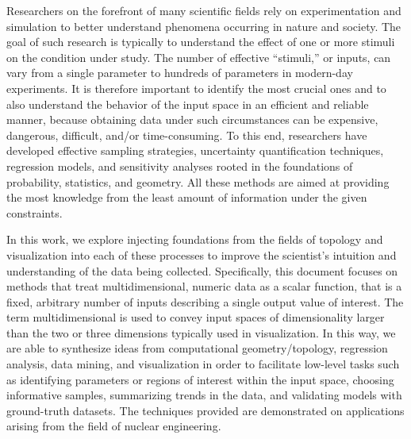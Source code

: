 
Researchers on the forefront of many scientific fields rely on experimentation and simulation to better understand phenomena occurring in nature and society.
%
The goal of such research is typically to understand the effect of one or more stimuli on the condition under study.
%
The number of effective ``stimuli,'' or inputs, can vary from a single parameter to hundreds of parameters in modern-day experiments.
%
It is therefore important to identify the most crucial ones and to also understand the behavior of the input space in an efficient and reliable manner, because obtaining data under such circumstances can be expensive, dangerous, difficult, and/or time-consuming.
%
To this end, researchers have developed effective sampling strategies, uncertainty quantification techniques, regression models, and sensitivity analyses rooted in the foundations of  probability, statistics, and geometry.
%
All these methods are aimed at providing the most knowledge from the least amount of information under the given constraints.

In this work, we explore injecting foundations from the fields of topology and visualization into each of these processes to improve the scientist's intuition and understanding of the data being collected.
%
Specifically, this document focuses on methods that treat multidimensional, numeric data as a scalar function, that is a fixed, arbitrary number of inputs describing a single output value of interest.
%
The term multidimensional is used to convey input spaces of dimensionality larger than the two or three dimensions typically used in visualization.
%
In this way, we are able to synthesize ideas from computational geometry/topology, regression analysis, data mining, and visualization in order to facilitate low-level tasks such as identifying parameters or regions of interest within the input space, choosing informative samples, summarizing trends in the data, and validating models with ground-truth datasets.
%
The techniques provided are demonstrated on applications arising from the field of nuclear engineering.

